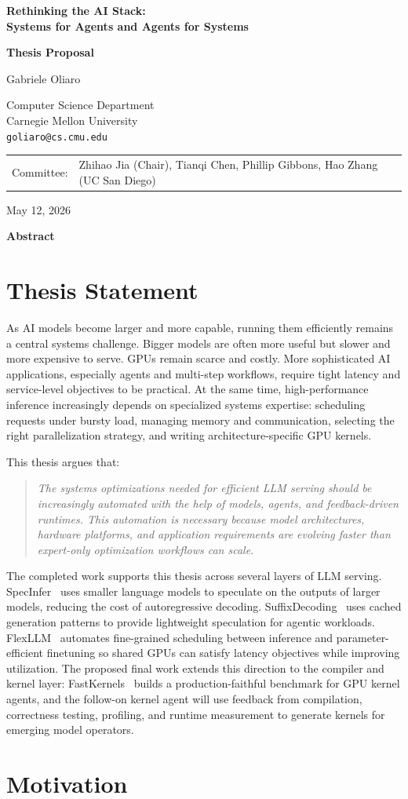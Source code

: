 \documentclass[11pt]{article}
\makeatletter
\newcommand{\SpecInfer}{SpecInfer}
\newcommand{\FlexLLM}{FlexLLM}
\newcommand{\SuffixDecoding}{SuffixDecoding}
\newcommand{\FastKernels}{FastKernels}
\newcommand{\makeproposalheader}{%
\begin{center}
\vspace*{1.0cm}
{\LARGE\bfseries Rethinking the AI Stack:\\
Systems for Agents and Agents for Systems\par}
\vspace{0.5em}
{\large\bfseries Thesis Proposal\par}
\vspace{2.2em}
{\large Gabriele Oliaro\par}
Computer Science Department\\
Carnegie Mellon University\\
\texttt{goliaro@cs.cmu.edu}
\vspace{1.2em}

\begin{tabular}{r@{\quad}p{4.8in}}
Committee: & Zhihao Jia (Chair), Tianqi Chen, Phillip Gibbons, Hao Zhang (UC San Diego)
\end{tabular}

\vspace{1.6em}
May 12, 2026

\vspace{2.6em}
{\bfseries Abstract}
\vspace{0.6em}

\begin{minipage}{0.84\textwidth}
\small

\end{minipage}
\end{center}
\vspace{1.8em}
}
\makeatother
\begin{document}
\makeproposalheader

\section{Thesis Statement}

As AI models become larger and more capable, running them efficiently remains a central systems challenge. Bigger models are often more useful but slower and more expensive to serve. GPUs remain scarce and costly. More sophisticated AI applications, especially agents and multi-step workflows, require tight latency and service-level objectives to be practical. At the same time, high-performance inference increasingly depends on specialized systems expertise: scheduling requests under bursty load, managing memory and communication, selecting the right parallelization strategy, and writing architecture-specific GPU kernels.

This thesis argues that:

\begin{quote}
\emph{The systems optimizations needed for efficient LLM serving should be increasingly automated with the help of models, agents, and feedback-driven runtimes. This automation is necessary because model architectures, hardware platforms, and application requirements are evolving faster than expert-only optimization workflows can scale.}
\end{quote}

The completed work supports this thesis across several layers of LLM serving. \SpecInfer{}~\cite{specinfer} uses smaller language models to speculate on the outputs of larger models, reducing the cost of autoregressive decoding. \SuffixDecoding{}~\cite{suffixdecoding} uses cached generation patterns to provide lightweight speculation for agentic workloads. \FlexLLM{}~\cite{flexllm} automates fine-grained scheduling between inference and parameter-efficient finetuning so shared GPUs can satisfy latency objectives while improving utilization. The proposed final work extends this direction to the compiler and kernel layer: \FastKernels{}~\cite{fastkernels} builds a production-faithful benchmark for GPU kernel agents, and the follow-on kernel agent will use feedback from compilation, correctness testing, profiling, and runtime measurement to generate kernels for emerging model operators.

\section{Motivation}
\end{document}

